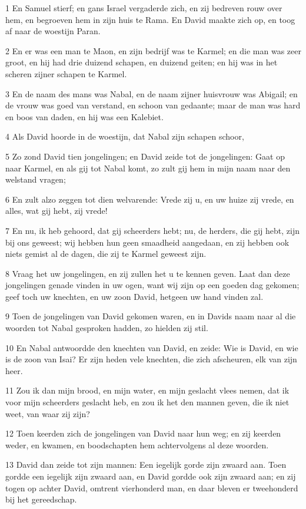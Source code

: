 \par 1 En Samuel stierf; en gans Israel vergaderde zich, en zij bedreven rouw over hem, en begroeven hem in zijn huis te Rama. En David maakte zich op, en toog af naar de woestijn Paran.
\par 2 En er was een man te Maon, en zijn bedrijf was te Karmel; en die man was zeer groot, en hij had drie duizend schapen, en duizend geiten; en hij was in het scheren zijner schapen te Karmel.
\par 3 En de naam des mans was Nabal, en de naam zijner huisvrouw was Abigail; en de vrouw was goed van verstand, en schoon van gedaante; maar de man was hard en boos van daden, en hij was een Kalebiet.
\par 4 Als David hoorde in de woestijn, dat Nabal zijn schapen schoor,
\par 5 Zo zond David tien jongelingen; en David zeide tot de jongelingen: Gaat op naar Karmel, en als gij tot Nabal komt, zo zult gij hem in mijn naam naar den welstand vragen;
\par 6 En zult alzo zeggen tot dien welvarende: Vrede zij u, en uw huize zij vrede, en alles, wat gij hebt, zij vrede!
\par 7 En nu, ik heb gehoord, dat gij scheerders hebt; nu, de herders, die gij hebt, zijn bij ons geweest; wij hebben hun geen smaadheid aangedaan, en zij hebben ook niets gemist al de dagen, die zij te Karmel geweest zijn.
\par 8 Vraag het uw jongelingen, en zij zullen het u te kennen geven. Laat dan deze jongelingen genade vinden in uw ogen, want wij zijn op een goeden dag gekomen; geef toch uw knechten, en uw zoon David, hetgeen uw hand vinden zal.
\par 9 Toen de jongelingen van David gekomen waren, en in Davids naam naar al die woorden tot Nabal gesproken hadden, zo hielden zij stil.
\par 10 En Nabal antwoordde den knechten van David, en zeide: Wie is David, en wie is de zoon van Isai? Er zijn heden vele knechten, die zich afscheuren, elk van zijn heer.
\par 11 Zou ik dan mijn brood, en mijn water, en mijn geslacht vlees nemen, dat ik voor mijn scheerders geslacht heb, en zou ik het den mannen geven, die ik niet weet, van waar zij zijn?
\par 12 Toen keerden zich de jongelingen van David naar hun weg; en zij keerden weder, en kwamen, en boodschapten hem achtervolgens al deze woorden.
\par 13 David dan zeide tot zijn mannen: Een iegelijk gorde zijn zwaard aan. Toen gordde een iegelijk zijn zwaard aan, en David gordde ook zijn zwaard aan; en zij togen op achter David, omtrent vierhonderd man, en daar bleven er tweehonderd bij het gereedschap.
